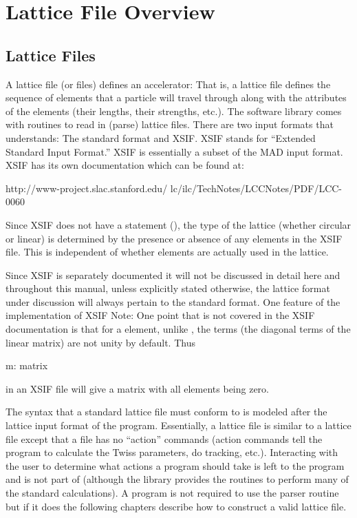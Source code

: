 \chapter{Lattice File Overview}

\section{Lattice Files}
\label{s:lattice_file_formats}

A lattice file (or files) defines an accelerator: That is, a lattice
file defines the sequence of elements that a particle will travel
through along with the attributes of the elements (their lengths,
their strengths, etc.). The \bmad software library comes with
routines to read in (parse) lattice files. There are two input formats
that \bmad understands: The \bmad standard format and
XSIF\cite{b:xsif}. XSIF stands for ``Extended Standard Input Format.''
XSIF is essentially a subset of the MAD input format. XSIF has its own
documentation which can be found at:
\begin{example}
  http://www-project.slac.stanford.edu/
              lc/ilc/TechNotes/LCCNotes/PDF/LCC-0060%
\end{example}
Since XSIF does not have a  statement
(), the type of the lattice (whether circular or linear)
is determined by the presence or absence of any  elements
in the XSIF file. This is independent of whether  elements
are actually used in the lattice.

Since XSIF is separately documented it will not be discussed in detail
here and throughout this manual, unless explicitly stated otherwise,
the lattice format under discussion will always pertain to the \bmad
standard format. One feature of the \bmad implementation of XSIF
Note: One point that is not covered in the XSIF
documentation is that for a  element, unlike \mad, the
 terms (the diagonal terms of the linear matrix) are not
unity by default. Thus
\begin{example}
  m: matrix
\end{example}
in an XSIF file will give a matrix with all elements being zero.


The syntax that a \bmad standard lattice file must conform to is
modeled after the lattice input format of the \mad program.
Essentially, a \bmad lattice file is similar to a \mad lattice file
except that a \bmad file has no ``action'' commands (action commands
tell the program to calculate the Twiss parameters, do tracking,
etc.).  Interacting with the user to determine what actions a program
should take is left to the program and is not part of \bmad (although
the \bmad library provides the routines to perform many of the standard
calculations). A program is not required to use the \bmad parser
routine but if it does the following chapters describe how to
construct a valid lattice file.

